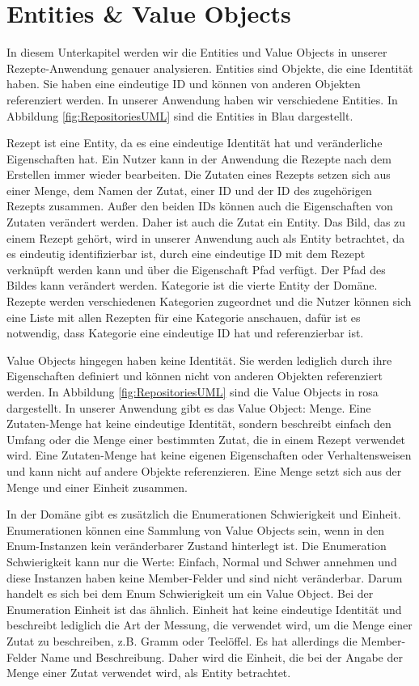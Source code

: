 \section{Entities \& Value Objects}
In diesem Unterkapitel werden wir die Entities und Value Objects in unserer Rezepte-Anwendung genauer analysieren. Entities sind Objekte, die eine Identität haben. Sie haben eine eindeutige ID und können von anderen Objekten referenziert werden. In unserer Anwendung haben wir verschiedene Entities. In Abbildung \ref{fig:RepositoriesUML} sind die Entities in Blau dargestellt.

Rezept ist eine Entity, da es eine eindeutige Identität hat und veränderliche Eigenschaften hat. Ein Nutzer kann in der Anwendung die Rezepte nach dem Erstellen immer wieder bearbeiten. Die Zutaten eines Rezepts setzen sich aus einer Menge, dem Namen der Zutat, einer ID und der ID des zugehörigen Rezepts zusammen. Außer den beiden IDs können auch die Eigenschaften von Zutaten verändert werden. Daher ist auch die Zutat ein Entity. Das Bild, das zu einem Rezept gehört, wird in unserer Anwendung auch als Entity betrachtet, da es eindeutig identifizierbar ist, durch eine eindeutige ID mit dem Rezept verknüpft werden kann und über die Eigenschaft Pfad verfügt. Der Pfad des Bildes kann verändert werden. Kategorie ist die vierte Entity der Domäne. Rezepte werden verschiedenen Kategorien zugeordnet und die Nutzer können sich eine Liste mit allen Rezepten für eine Kategorie anschauen, dafür ist es notwendig, dass Kategorie eine eindeutige ID hat und referenzierbar ist.

Value Objects hingegen haben keine Identität. Sie werden lediglich durch ihre Eigenschaften definiert und können nicht von anderen Objekten referenziert werden. In Abbildung \ref{fig:RepositoriesUML} sind die Value Objects in rosa dargestellt. In unserer Anwendung gibt es das Value Object: Menge. Eine Zutaten-Menge hat keine eindeutige Identität, sondern beschreibt einfach den Umfang oder die Menge einer bestimmten Zutat, die in einem Rezept verwendet wird. Eine Zutaten-Menge hat keine eigenen Eigenschaften oder Verhaltensweisen und kann nicht auf andere Objekte referenzieren. Eine Menge setzt sich aus der Menge und einer Einheit zusammen. 

In der Domäne gibt es zusätzlich die Enumerationen Schwierigkeit und Einheit. Enumerationen können eine Sammlung von Value Objects sein, wenn in den Enum-Instanzen kein veränderbarer Zustand hinterlegt ist. Die Enumeration Schwierigkeit kann nur die Werte: Einfach, Normal und Schwer annehmen und diese Instanzen haben keine Member-Felder und sind nicht veränderbar. Darum handelt es sich bei dem Enum Schwierigkeit um ein Value Object. Bei der Enumeration Einheit ist das ähnlich. Einheit hat keine eindeutige Identität und beschreibt lediglich die Art der Messung, die verwendet wird, um die Menge einer Zutat zu beschreiben, z.B. Gramm oder Teelöffel. Es hat allerdings die Member-Felder Name und Beschreibung. Daher wird die Einheit, die bei der Angabe der Menge einer Zutat verwendet wird, als Entity betrachtet.

